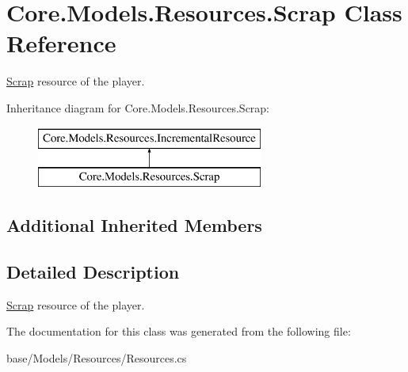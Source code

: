 \hypertarget{classCore_1_1Models_1_1Resources_1_1Scrap}{}\section{Core.\+Models.\+Resources.\+Scrap Class Reference}
\label{classCore_1_1Models_1_1Resources_1_1Scrap}


\hyperlink{classCore_1_1Models_1_1Resources_1_1Scrap}{Scrap} resource of the player.  


Inheritance diagram for Core.\+Models.\+Resources.\+Scrap\+:\begin{figure}[H]
\begin{center}
\leavevmode
\includegraphics[height=2.000000cm]{classCore_1_1Models_1_1Resources_1_1Scrap}
\end{center}
\end{figure}
\subsection*{Additional Inherited Members}


\subsection{Detailed Description}
\hyperlink{classCore_1_1Models_1_1Resources_1_1Scrap}{Scrap} resource of the player. 



The documentation for this class was generated from the following file\+:\begin{DoxyCompactItemize}
\item 
base/\+Models/\+Resources/Resources.\+cs\end{DoxyCompactItemize}
